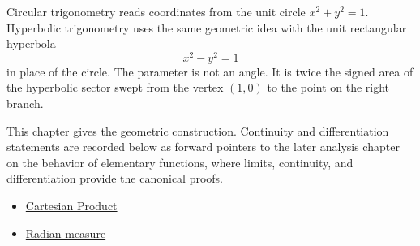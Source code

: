 \begin{remark*}
Circular trigonometry reads coordinates from the unit circle
$x^2+y^2=1$. Hyperbolic trigonometry uses the same geometric idea with the
unit rectangular hyperbola
\[
  x^2-y^2=1
\]
in place of the circle. The parameter is not an angle. It is twice the signed
area of the hyperbolic sector swept from the vertex $(1,0)$ to the point on
the right branch.
\end{remark*}



\begin{remark*}
This chapter gives the geometric construction. Continuity and differentiation
statements are recorded below as forward pointers to the later analysis
chapter on the behavior of elementary functions, where limits, continuity, and
differentiation provide the canonical proofs.
\end{remark*}
\begin{dependencies}
\begin{itemize}
  \item \hyperref[def:cartesian-product]{Cartesian Product}
  \item \hyperref[def:radian-measure]{Radian measure}
\end{itemize}
\end{dependencies}
